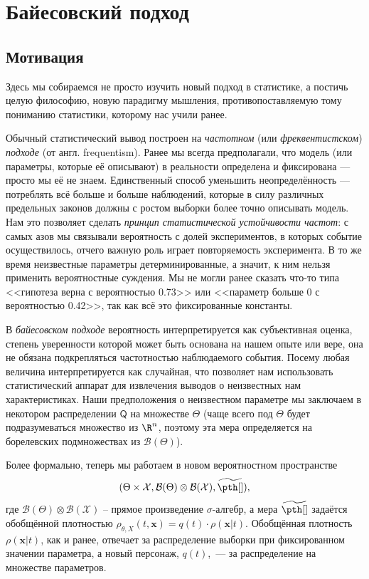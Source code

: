\section{Байесовский подход}\label{bayes_method}

\subsection{Мотивация}



Здесь мы собираемся не просто изучить новый подход в статистике, а постичь целую философию, новую парадигму мышления, противопоставляемую тому пониманию статистики, которому нас учили ранее.

Обычный статистический вывод построен на \textit{частотном} (или \textit{фреквентистском}) \textit{подходе} (от англ. \textsf{frequentism}). Ранее мы всегда предполагали, что модель (или параметры, которые её описывают) в реальности определена и фиксирована --- просто мы её не знаем. Единственный способ уменьшить неопределённость --- потреблять всё больше и больше наблюдений, которые в силу различных предельных законов должны с ростом выборки более точно описывать модель. Нам это позволяет сделать \textit{принцип статистической устойчивости частот}: с самых азов мы связывали вероятность с долей экспериментов, в которых событие осуществилось, отчего важную роль играет повторяемость эксперимента. В то же время неизвестные параметры детерминированные, а значит, к ним нельзя применить вероятностные суждения. Мы не могли ранее сказать что-то типа <<гипотеза верна с вероятностью 0.73>> или <<параметр больше 0 с вероятностью 0.42>>, так как всё это фиксированные константы.

В \textit{байесовском подходе} вероятность интерпретируется как субъективная оценка, степень уверенности которой может быть основана на нашем опыте или вере, она не обязана подкрепляться частотностью наблюдаемого события. Посему любая величина интерпретируется как случайная, что позволяет нам использовать статистический аппарат для извлечения выводов о неизвестных нам характеристиках. Наши предположения о неизвестном параметре мы заключаем в некотором распределении $\mathsf{Q}$ на множестве $\Theta$ (чаще всего под $\Theta$ будет подразумеваться множество из $\R^n$, поэтому эта мера определяется на борелевских подмножествах из $\mathcal{B}(\Theta)$).

Более формально, теперь мы работаем в новом вероятностном пространстве $$(\Theta\times\mathcal{X}, \mathcal{B}(\Theta) \otimes\mathcal{B}(\mathcal{X}), \widetilde{\pth[]}),$$ где $\mathcal{B}(\Theta) \otimes\mathcal{B}(\mathcal{X})$ -- прямое произведение $\sigma$-алгебр, а мера $\widetilde{\pth[]}$ задаётся обобщённой плотностью $\rho_{\theta, X}(t, \mathbf{x}) = q(t)\cdot \rho(\mathbf{x} | t)$. Обобщённая плотность $\rho(\mathbf{x} | t)$, как и ранее, отвечает за распределение выборки при фиксированном значении параметра, а новый персонаж, $q(t)$,~--- за распределение на множестве параметров.

